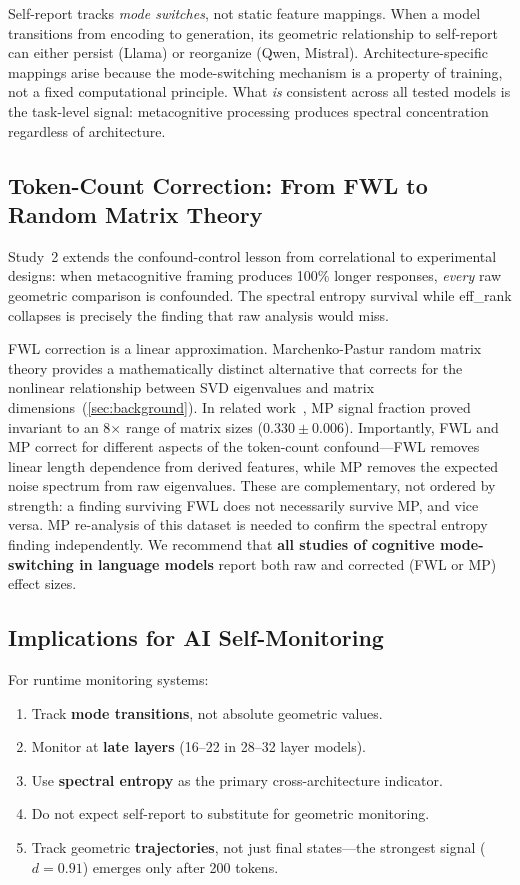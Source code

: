 \documentclass[11pt,a4paper]{article}
\begin{document}
Self-report tracks \emph{mode switches}, not static feature mappings. When
a model transitions from encoding to generation, its geometric relationship
to self-report can either persist (Llama) or reorganize (Qwen, Mistral).
Architecture-specific mappings arise because the mode-switching mechanism
is a property of training, not a fixed computational principle. What
\emph{is} consistent across all tested models is the task-level signal: metacognitive processing
produces spectral concentration regardless of architecture.

\subsection{Token-Count Correction: From FWL to Random Matrix Theory}

Study~2 extends the confound-control lesson from correlational to
experimental designs: when metacognitive framing produces 100\% longer
responses, \emph{every} raw geometric comparison is confounded. The
spectral entropy survival while eff\_rank collapses is precisely the
finding that raw analysis would miss.

FWL correction is a linear approximation. Marchenko-Pastur random matrix
theory provides a mathematically distinct alternative that corrects for
the nonlinear relationship between SVD eigenvalues and matrix
dimensions~(\cref{sec:background}). In related work~\citep{lyra2026oracle},
MP signal fraction proved invariant to an 8$\times$ range of matrix sizes
($0.330 \pm 0.006$). Importantly, FWL and MP correct for different
aspects of the token-count confound---FWL removes linear length
dependence from derived features, while MP removes the expected noise
spectrum from raw eigenvalues. These are complementary, not ordered by
strength: a finding surviving FWL does not necessarily survive MP, and
vice versa. MP re-analysis of this dataset is needed to confirm the
spectral entropy finding independently.
We recommend that \textbf{all studies of cognitive mode-switching in
language models} report both raw and corrected (FWL or MP) effect sizes.

\subsection{Implications for AI Self-Monitoring}

For runtime monitoring systems:

\begin{enumerate}[nosep]
    \item Track \textbf{mode transitions}, not absolute geometric values.
    \item Monitor at \textbf{late layers} (16--22 in 28--32 layer models).
    \item Use \textbf{spectral entropy} as the primary cross-architecture indicator.
    \item Do not expect self-report to substitute for geometric monitoring.
    \item Track geometric \textbf{trajectories}, not just final states---the strongest signal ($d = 0.91$) emerges only after 200 tokens.
\end{enumerate}
\end{document}
